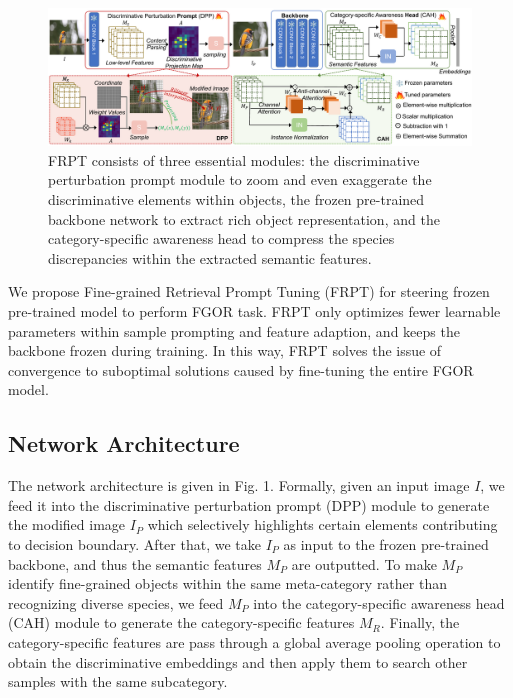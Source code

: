 \documentclass[letterpaper]{article} %
\begin{document}
\begin{figure}[t]
\begin{center}
   \includegraphics[width=1\linewidth]{ap}
\end{center}
   \caption{FRPT consists of three essential modules: the discriminative perturbation prompt module to zoom and even exaggerate the discriminative elements within objects, the frozen pre-trained backbone network to extract rich object representation, and the category-specific awareness head to compress the species discrepancies within the extracted semantic features.}

\end{figure}




We propose Fine-grained Retrieval Prompt Tuning (FRPT) for steering frozen pre-trained model to perform FGOR task. FRPT only optimizes fewer learnable parameters within sample prompting and feature adaption, and keeps the backbone frozen during training. In this way, FRPT solves the issue of convergence to suboptimal solutions caused by fine-tuning the entire FGOR model.



\subsection{Network Architecture}
The network architecture is given in Fig. 1.
Formally, given an input image $ I $, we feed it into the discriminative perturbation prompt (DPP) module to generate the modified image $ I_P $ which selectively highlights certain elements contributing to decision boundary. After that, we take $ I_P $ as input to the frozen pre-trained backbone, and thus the semantic features $ M_P $ are outputted.
To make $M_P$ identify fine-grained objects within the same meta-category rather than recognizing diverse species, we feed $ M_P $ into the category-specific awareness head (CAH) module to generate the category-specific features $ M_R $.  Finally, the category-specific features are pass through a global average pooling operation to obtain the discriminative embeddings and then apply them to search other samples with the same subcategory. %
\end{document}
